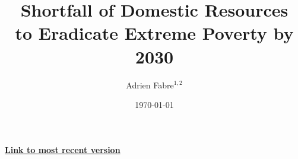 

% 



% 
% 

% 


\title{Shortfall of Domestic Resources\\ to Eradicate Extreme Poverty by 2030} 

\author{Adrien Fabre$^{1,2}$} %

\date{\today} %



\sloppy
\maketitle

\begin{center}
{\textbf{\href{https://github.com/bixiou/domestic_poverty_eradication/raw/main/paper/poverty.pdf}{Link to most recent version}}}
\end{center}


